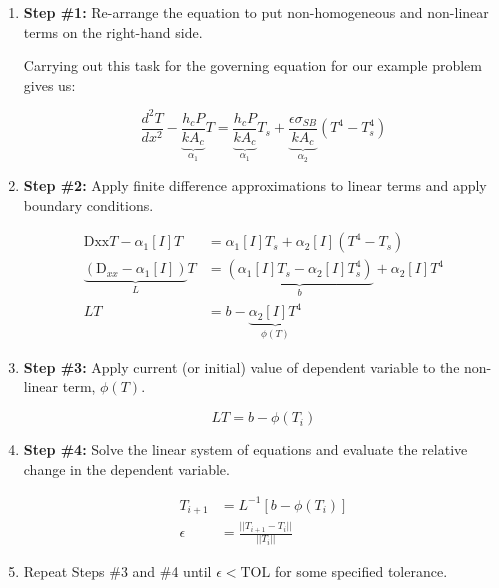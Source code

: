 \begin{enumerate}
\item \textbf{Step \#1:} Re-arrange the equation to put non-homogeneous and non-linear terms on the right-hand side.  

\vspace{0.25cm}

\noindent Carrying out this task for the governing equation for our example problem gives us:

\begin{equation*}
\frac{d^2 T}{dx^2} - \underbrace{\frac{h_c P}{k A_{c}}}_{\alpha_1}T = \underbrace{\frac{h_c P}{k A_c}}_{\alpha_1} T_s + \underbrace{\frac{\epsilon \sigma_{SB}}{kA_c}}_{\alpha_2}\left(T^4 - T_s^4 \right)
\end{equation*}

\item \textbf{Step \#2:} Apply finite difference approximations to linear terms and apply boundary conditions.

\begin{align*}
\text{Dxx}T - \alpha_1 \left[I\right] T &= \alpha_1 \left[I\right]T_s + \alpha_2 \left[I\right]\left(T^4-T_s\right) \\
\underbrace{\left(\text{D}_{xx} - \alpha_1\left[I\right]\right)}_{L}T &= \underbrace{\left(\alpha_1 \left[I\right]T_s - \alpha_2 \left[I\right]T_s^4\right)}_{b} + \alpha_2\left[I\right]T^4 \\
LT &= b - \underbrace{\alpha_2 \left[I\right]T^4}_{\phi(T)}
\end{align*}

\item \textbf{Step \#3:} Apply current (or initial) value of dependent variable to the non-linear term, $\phi(T)$. 

\begin{equation*}
LT = b - \phi(T_i)
\end{equation*}

\item \textbf{Step \#4:} Solve the linear system of equations and evaluate the relative change in the dependent variable.

\begin{align*}
T_{i+1} &= L^{-1} \left[b - \phi(T_i)\right] \\
\epsilon &= \frac{||T_{i+1} - T_i||}{||T_i||}
\end{align*}

\item Repeat Steps \#3 and \#4 until $\epsilon < \text{TOL}$ for some specified tolerance.

\end{enumerate}
